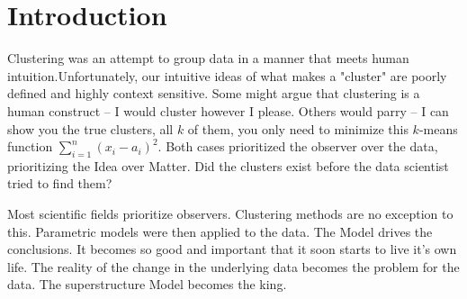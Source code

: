 \documentclass[12pt, a4paper, twocolumn]{article}
\begin{document}

\renewenvironment{abstract}
 {\small
  \begin{center}
  \bfseries \abstractname\vspace{-.5em}\vspace{0pt}
  \end{center}
  \list{}{
    \setlength{\leftmargin}{2.cm}%
    \setlength{\rightmargin}{\leftmargin}%
  }%
  \item\relax}
 {\endlist}

\twocolumn[
  \begin{@twocolumnfalse}
    \maketitle
    \begin{abstract}
      \abstractText
      \newline
      \newline
    \end{abstract}

  \end{@twocolumnfalse}
]


\section{Introduction}

Clustering was an attempt to group data in a manner that meets human intuition.Unfortunately, our intuitive ideas of what makes a "cluster" are poorly defined and highly context sensitive\cite{WhatAreTrueClusters}.
Some might argue that clustering is a human construct -- I would cluster however I please. Others would parry -- I can show you the true clusters, all $k$ of them, you only need to minimize this $k$-means\cite{kmeans} function $\sum_{i=1}^{n} (x_{i}-a_{i})^{2}$. Both cases prioritized the observer over the data, prioritizing the Idea over Matter. Did the clusters exist before the data scientist tried to find them?

Most scientific fields prioritize observers. Clustering methods are no exception to this. Parametric models were then applied to the data. The Model drives the conclusions. It becomes so good and important that it soon starts to live it's own life. The reality of the change in the underlying data becomes the problem for the data. The superstructure Model becomes the king.
\end{document}
